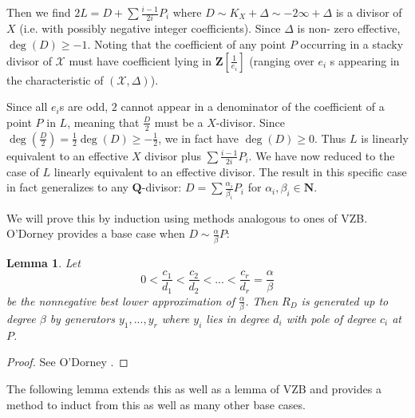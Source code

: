 \documentclass{amsart}
\theoremstyle{plain}
\newtheorem{lem}[thm]{Lemma}
\theoremstyle{definition}
\theoremstyle{remark}
\numberwithin{equation}{section}
\newcommand \sx{\mathscr X}
\newcommand \subhalf[1]{\frac{{#1} - 1}{2{#1}}}
\newcommand \halfcan{L}
\begin{document}
Then we find $2\halfcan=D+\sum \subhalf{i}P_i$ where $D\sim K_X+
\Delta\sim -2\infty+ \Delta$ is a divisor of $X$ (i.e. with 
possibly negative integer coefficients).  Since $\Delta$ is non-
zero effective, $\deg(D)\ge -1$.   Noting that the coefficient of 
any point $P$ occurring in a stacky divisor of $\sx$ must have 
coefficient lying in $\mathbf{Z}[\frac{1}{e_i}]$ (ranging over $e_i$
s appearing in the characteristic of $(\sx,\Delta)$).
 
Since all $e_i$s are odd, $2$ cannot appear in a denominator of the 
coefficient of a point $P$ in $\halfcan$, meaning that $\frac{D}{2}$
 must be a $X$-divisor.  Since $\deg(\frac{D}{2})=\frac{1}{2}\deg(D)
\ge -\frac{1}{2}$, we in fact have $\deg(D)\ge 0$.  Thus $\halfcan$ 
is linearly equivalent to an effective $X$ divisor plus $\sum 
\subhalf{i}P_i$.  We have now reduced to the case of $\halfcan$ 
linearly equivalent to an effective divisor.  The result in this 
specific case in fact generalizes to any $\mathbf{Q}$-divisor: $D=\sum
\frac{\alpha_i}{\beta_i} P_i$ for $\alpha_i,\beta_i\in \mathbf{N}$.  

We will prove this by induction using methods analogous to ones of VZB.  O'Dorney  provides a base case when $D
\sim \frac{\alpha}{\beta} P$:
\begin{lem}\label{lem:O'Dorney_1_point}
Let 
\[
	0<\frac{c_1}{d_1}<\frac{c_2}{d_2}<...<\frac{c_r}{d_r}=\frac{\alpha}{\beta}
\] 
be the nonnegative best lower approximation of $\frac{\alpha}{\beta}
$.  Then $R_D$ is generated up to degree $\beta$ by generators $y_1,...,y_r$ where $y_i$ 
lies in degree $d_i$ with pole of degree $c_i$ at $P$.  
\end{lem}
\begin{proof}
See O'Dorney .
\end{proof}

The following lemma extends this as well as a lemma of VZB  and provides a method to induct from this as well as many other base cases.
\end{document}
